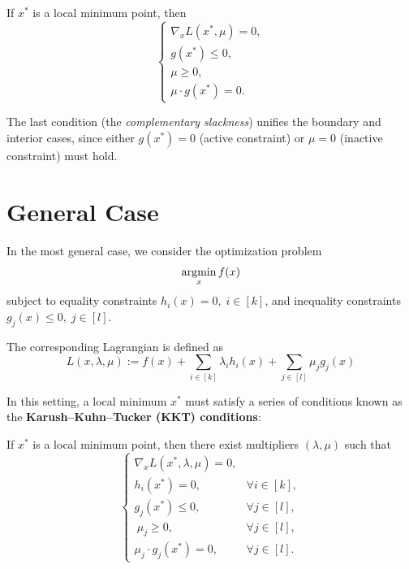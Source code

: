 \documentclass[../main]{subfiles}
\begin{document}
\begin{theorem}
    If $x^*$ is a local minimum point, then
    \begin{equation}
        \begin{cases}
            \nabla_x L(x^*, \mu) = 0, \\
            g(x^*) \leq 0, \\
            \mu \geq 0, \\
            \mu \cdot g(x^*) = 0.
        \end{cases}
    \end{equation}
\end{theorem}

The last condition (the \emph{complementary slackness}) unifies the boundary and interior cases, since either $g(x^*)=0$ (active constraint) or $\mu=0$ (inactive constraint) must hold.
\section{General Case}
In the most general case, we consider the optimization problem
\begin{equation}
    \mathop{\mathrm{argmin}}_x f(x)
\end{equation}
subject to equality constraints $h_i(x) = 0, \; i \in [k]$, and inequality constraints $g_j(x) \leq 0, \; j \in [l]$.  

The corresponding Lagrangian is defined as
\begin{equation}
    L(x, \lambda, \mu) := f(x) + \sum_{i \in [k]} \lambda_i h_i(x) + \sum_{j \in [l]} \mu_j g_j(x)
\end{equation}

In this setting, a local minimum $x^*$ must satisfy a series of conditions known as the \textbf{Karush--Kuhn--Tucker (KKT) conditions}:

\begin{theorem}
    If $x^*$ is a local minimum point, then there exist multipliers $(\lambda, \mu)$ such that
    \begin{equation}
        \begin{cases}
            \nabla_x L(x^*, \lambda, \mu) = 0, & \\
            h_i(x^*) = 0, & \forall i \in [k],  \\
            g_j(x^*) \leq 0, & \forall j \in [l], \\\
            \mu_j \geq 0, & \forall j \in [l], \\
            \mu_j \cdot g_j(x^*) = 0, & \forall j \in [l]. 
        \end{cases}
    \end{equation}
\end{theorem}
\end{document}
